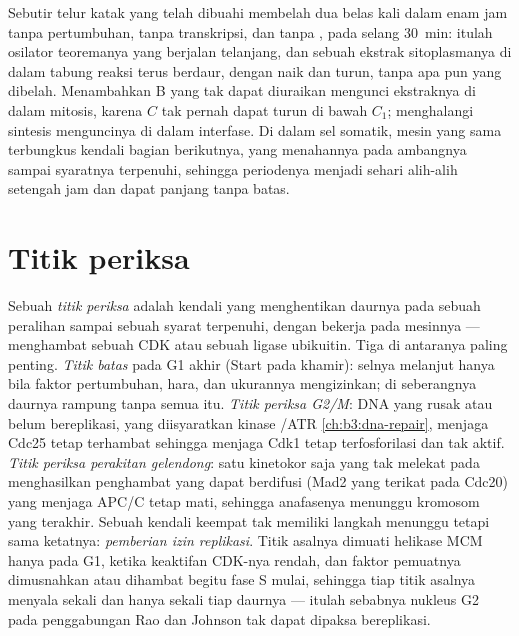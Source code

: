 \begin{example}\label{ex:b3:cell-cycle-apoptosis:frog}
Sebutir telur katak yang telah dibuahi membelah dua belas kali dalam enam jam
tanpa pertumbuhan, tanpa transkripsi, dan tanpa , pada selang
\qty{30}{min}: itulah osilator teoremanya yang berjalan telanjang, dan sebuah
ekstrak sitoplasmanya di dalam tabung reaksi terus berdaur, dengan 
naik dan turun, tanpa apa pun yang dibelah. Menambahkan  B yang tak
dapat diuraikan mengunci ekstraknya di dalam mitosis, karena $C$ tak pernah
dapat turun di bawah $C_{1}$; menghalangi sintesis  menguncinya di
dalam interfase. Di dalam sel somatik, mesin yang sama terbungkus kendali
bagian berikutnya, yang menahannya pada ambangnya sampai syaratnya terpenuhi,
sehingga periodenya menjadi sehari alih-alih setengah jam dan dapat panjang
tanpa batas.
\end{example}

\section{Titik periksa}

\begin{definition}\label{def:b3:cell-cycle-apoptosis:checkpoints}
%
Sebuah \emph{titik periksa} adalah kendali yang menghentikan daurnya pada
sebuah peralihan sampai sebuah syarat terpenuhi, dengan bekerja pada mesinnya
--- menghambat sebuah CDK atau sebuah ligase ubikuitin. Tiga di antaranya
paling penting. \emph{Titik batas} pada G1 akhir (Start pada khamir): selnya
melanjut hanya bila faktor pertumbuhan, hara, dan ukurannya mengizinkan; di
seberangnya daurnya rampung tanpa semua itu. \emph{Titik periksa G2/M}: DNA
yang rusak atau belum bereplikasi, yang diisyaratkan kinase /ATR
\cref{ch:b3:dna-repair}, menjaga Cdc25 tetap terhambat sehingga menjaga Cdk1
tetap terfosforilasi dan tak aktif. \emph{Titik periksa perakitan gelendong}:
satu kinetokor saja yang tak melekat pada  menghasilkan penghambat
yang dapat berdifusi (Mad2 yang terikat pada Cdc20) yang menjaga APC/C tetap
mati, sehingga anafasenya menunggu kromosom yang terakhir. Sebuah kendali
keempat tak memiliki langkah menunggu tetapi sama ketatnya: \emph{pemberian
izin replikasi}. Titik asalnya dimuati helikase MCM hanya pada G1, ketika
keaktifan CDK-nya rendah, dan faktor pemuatnya dimusnahkan atau dihambat
begitu fase S mulai, sehingga tiap titik asalnya menyala sekali dan hanya
sekali tiap daurnya --- itulah sebabnya nukleus G2 pada penggabungan Rao dan
Johnson tak dapat dipaksa bereplikasi.
\end{definition}

